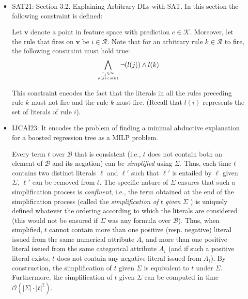\begin{itemize}
\item SAT21: \cite{IgnatievS21} Section 3.2. Explaining Arbitrary DLs with SAT.
In this section the following constraint is defined:

Let \(\mathbf{v}\) denote a point in feature space with prediction \(c \in \mathcal{K}\). Moreover, let the rule that fires on \(\mathbf{v}\) be \(i \in \mathcal{R}\). Note that for an arbitrary rule \(k \in \mathcal{R}\) to fire, the following constraint must hold true:
\[
\bigwedge_{r_j \in \mathcal{R} \atop o(j) < o(k)} \neg(l(j)) \land l(k)
\]

This constraint encodes the fact that the literals in all the rules preceding rule
$k$ must not fire and the rule $k$ must fire. (Recall that $l(i)$ represents the set of
literals of rule $i$). 

\item IJCAI23: \cite{Audemard23}
It encodes the problem of finding a minimal abductive explanation for a boosted 
regression tree as a MILP problem.

Every term $t$ over $\mathcal{B}$ that is consistent (i.e., $t$ does not
contain both an element of $\mathcal{B}$ and its negation) can be \emph{simplified} 
using $\Sigma$. Thus, each time $t$ contains two distinct literals $\ell$ and 
$\ell'$ such that $\ell'$ is entailed by $\ell$ given $\Sigma$, $\ell'$
can be removed from $t$. The specific nature of $\Sigma$ ensures that such a 
simplification process is \emph{confluent}, i.e., the term obtained at the end of the 
simplification process (called the \emph{simplification of} $t$ \emph{given} 
$\Sigma$ ) is uniquely defined whatever the ordering according to which the literals are 
considered (this would not be ensured if $\Sigma$ was any formula over $\mathcal{B}$). 
Thus, when simplified, $t$ cannot contain more than one positive (resp. negative) 
literal issued from the same numerical attribute $A_i$ and more than one positive 
literal issued from the same categorical attribute $A_i$ (and if such a positive 
literal exists, $t$ does not contain any negative literal issued from $A_i$). 
By construction, the simplification of $t$  given $\Sigma$ is equivalent to $t$
under $\Sigma$. Furthermore, the simplification of $t$ given $\Sigma$ can be 
computed in time $\mathcal{O}(|\Sigma| \cdot |t|^2)$.


\end{itemize}


